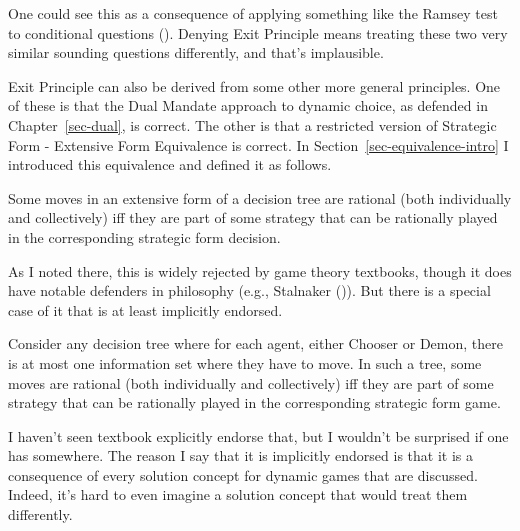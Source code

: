 \documentclass[
  12pt,
  letterpaper,
  DIV=11,
  numbers=noendperiod]{scrreprt}
\providecommand{\tightlist}{%
  \setlength{\itemsep}{0pt}\setlength{\parskip}{0pt}}\usepackage{longtable,booktabs,array}
\begin{document}
One could see this as a consequence of applying something like the
Ramsey test to conditional questions
(). Denying Exit Principle
means treating these two very similar sounding questions differently,
and that's implausible.

Exit Principle can also be derived from some other more general
principles. One of these is that the Dual Mandate approach to dynamic
choice, as defended in Chapter~\ref{sec-dual}, is correct. The other is
that a restricted version of Strategic Form - Extensive Form Equivalence
is correct. In Section~\ref{sec-equivalence-intro} I introduced this
equivalence and defined it as follows.

\begin{description}
\tightlist
\item[Strategic Form - Extensive Form Equivalence]
Some moves in an extensive form of a decision tree are rational (both
individually and collectively) iff they are part of some strategy that
can be rationally played in the corresponding strategic form decision.
\end{description}

As I noted there, this is widely rejected by game theory textbooks,
though it does have notable defenders in philosophy (e.g., Stalnaker
()). But there is a special case of it
that is at least implicitly endorsed.

\begin{description}
\tightlist
\item[Restricted Strategic Form - Extensive Form Equivalence]
Consider any decision tree where for each agent, either Chooser or
Demon, there is at most one information set where they have to move. In
such a tree, some moves are rational (both individually and
collectively) iff they are part of some strategy that can be rationally
played in the corresponding strategic form game.
\end{description}

I haven't seen textbook explicitly endorse that, but I wouldn't be
surprised if one has somewhere. The reason I say that it is implicitly
endorsed is that it is a consequence of every solution concept for
dynamic games that are discussed. Indeed, it's hard to even imagine a
solution concept that would treat them differently.
\end{document}
